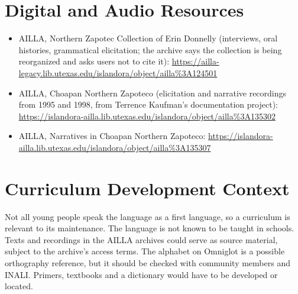 \documentclass[12pt]{article}
\begin{document}
\section{Digital and Audio Resources}
\begin{itemize}
\item AILLA, Northern Zapotec Collection of Erin Donnelly (interviews, oral histories, grammatical elicitation; the archive says the collection is being reorganized and asks users not to cite it): \url{https://ailla-legacy.lib.utexas.edu/islandora/object/ailla%3A124501}
\item AILLA, Choapan Northern Zapoteco (elicitation and narrative recordings from 1995 and 1998, from Terrence Kaufman's documentation project): \url{https://islandora-ailla.lib.utexas.edu/islandora/object/ailla%3A135302}
\item AILLA, Narratives in Choapan Northern Zapoteco: \url{https://islandora-ailla.lib.utexas.edu/islandora/object/ailla%3A135307}
\end{itemize}

\section{Curriculum Development Context}
Not all young people speak the language as a first language, so a curriculum is relevant to its maintenance. The language is not known to be taught in schools. Texts and recordings in the AILLA archives could serve as source material, subject to the archive's access terms. The alphabet on Omniglot is a possible orthography reference, but it should be checked with community members and INALI. Primers, textbooks and a dictionary would have to be developed or located.
\end{document}
